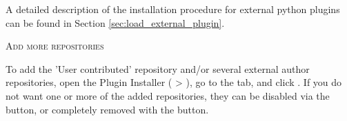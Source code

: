 A detailed description of the installation procedure for external python 
plugins can be found in Section \ref{sec:load_external_plugin}.

\begin{Tip} \caption{\textsc{Add more repositories}}
To add the 'User contributed' repository and/or several external author repositories, open the 
Plugin Installer ( > ),
go to the  tab, and click . 
If you do not want one or more of the added repositories, they can be disabled via the 
 button, or completely removed with the  button.
\end{Tip}
